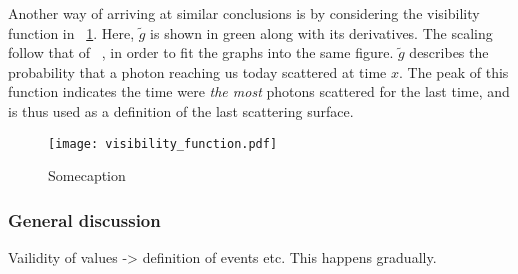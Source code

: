     Another way of arriving at similar conclusions is by considering the visibility function in ~\cref{fig:m2:visibility_function}. Here, $\tilde{g}$ is shown in green along with its derivatives. The scaling follow that of ~\cite{https://doi.org/10.48550/arxiv.astro-ph/0606683}, in order to fit the graphs into the same figure. $\tilde{g}$ describes the probability that a photon reaching us today scattered at time $x$. The peak of this function indicates the time were \textit{the most} photons scattered for the last time, and is thus used as a definition of the last scattering surface.
    \begin{figure}
        \texttt{[image: visibility\_function.pdf]}
        \caption{Somecaption}
        \label{fig:m2:visibility_function}
    \end{figure}

    \subsubsection{General discussion}
    Vailidity of values -> definition of events etc. This happens gradually. 

